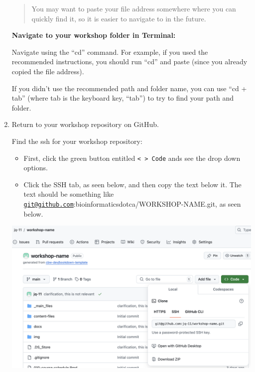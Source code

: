 \documentclass[
]{book}
\providecommand{\tightlist}{%
  \setlength{\itemsep}{0pt}\setlength{\parskip}{0pt}}
\newenvironment{bluebox}{
  \definecolor{shadecolor}{RGB}{172, 210, 237}
  \color{white}
  \begin{shaded}}
 {\end{shaded}}
\newenvironment{greenbox}{
  \definecolor{shadecolor}{RGB}{141, 181, 128}
  \color{white}
  \begin{shaded}}
 {\end{shaded}}
\theoremstyle{definition}
\theoremstyle{definition}
\theoremstyle{definition}
\theoremstyle{definition}
\theoremstyle{remark}
\begin{document}
\begin{enumerate}
\begin{bluebox}
  \begin{quote}
  You may want to paste your file address somewhere where you can quickly find it, so it is easier to navigate to in the future.
  \end{quote}

  \end{bluebox}

  \begin{greenbox}

  \begin{center}
  \textbf{Navigate to your workshop folder in Terminal:}

  \end{center}

  Navigate using the ``cd'' command. For example, if you used the recommended instructions, you should run ``cd'' and paste (since you already copied the file address).

  If you didn't use the recommended path and folder name, you can use ``cd + tab'' (where tab is the keyboard key, ``tab'') to try to find your path and folder.

  \end{greenbox}
\item
  Return to your workshop repository on GitHub.

  Find the ssh for your workshop repository:

  \begin{itemize}
  \tightlist
  \item
    First, click the green button entitled \texttt{\textless{}\ \textgreater{}\ Code} ands see the drop down options.
  \item
    Click the SSH tab, as seen below, and then copy the text below it. The text should be something like \href{mailto:git@github.com}{\nolinkurl{git@github.com}}:bioinformaticsdotca/WORKSHOP-NAME.git, as seen below.
  \end{itemize}

  \includegraphics{img/git-instruct/copy-ssh.png}\\


\end{enumerate}
\end{document}
